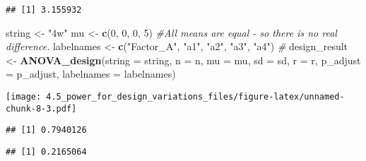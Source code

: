 \documentclass[]{article}
\newenvironment{Shaded}{\begin{snugshade}}{\end{snugshade}}
\newcommand{\KeywordTok}[1]{\textcolor[rgb]{0.13,0.29,0.53}{\textbf{#1}}}
\newcommand{\DataTypeTok}[1]{\textcolor[rgb]{0.13,0.29,0.53}{#1}}
\newcommand{\DecValTok}[1]{\textcolor[rgb]{0.00,0.00,0.81}{#1}}
\newcommand{\StringTok}[1]{\textcolor[rgb]{0.31,0.60,0.02}{#1}}
\newcommand{\CommentTok}[1]{\textcolor[rgb]{0.56,0.35,0.01}{\textit{#1}}}
\newcommand{\OperatorTok}[1]{\textcolor[rgb]{0.81,0.36,0.00}{\textbf{#1}}}
\newcommand{\NormalTok}[1]{#1}
\begin{document}
\begin{verbatim}
## [1] 3.155932
\end{verbatim}

\begin{Shaded}
\begin{Highlighting}[]
\NormalTok{string <-}\StringTok{ "4w"}
\NormalTok{mu <-}\StringTok{ }\KeywordTok{c}\NormalTok{(}\DecValTok{0}\NormalTok{, }\DecValTok{0}\NormalTok{, }\DecValTok{0}\NormalTok{, }\DecValTok{5}\NormalTok{) }\CommentTok{#All means are equal - so there is no real difference.}
\NormalTok{labelnames <-}\StringTok{ }\KeywordTok{c}\NormalTok{(}\StringTok{"Factor_A"}\NormalTok{, }\StringTok{"a1"}\NormalTok{, }\StringTok{"a2"}\NormalTok{, }\StringTok{"a3"}\NormalTok{, }\StringTok{"a4"}\NormalTok{) }\CommentTok{#}
\NormalTok{design_result <-}\StringTok{ }\KeywordTok{ANOVA_design}\NormalTok{(}\DataTypeTok{string =}\NormalTok{ string, }\DataTypeTok{n =}\NormalTok{ n, }\DataTypeTok{mu =}\NormalTok{ mu, }\DataTypeTok{sd =}\NormalTok{ sd, }\DataTypeTok{r =}\NormalTok{ r, }
                   \DataTypeTok{p_adjust =}\NormalTok{ p_adjust, }\DataTypeTok{labelnames =}\NormalTok{ labelnames)}
\end{Highlighting}
\end{Shaded}

\texttt{[image: 4.5\_power\_for\_design\_variations\_files/figure-latex/unnamed-chunk-8-3.pdf]}

\begin{Shaded}
\end{Shaded}

\begin{verbatim}
## [1] 0.7940126
\end{verbatim}

\begin{Shaded}
\end{Shaded}

\begin{verbatim}
## [1] 0.2165064
\end{verbatim}

\begin{Shaded}
\end{Shaded}
\end{document}
